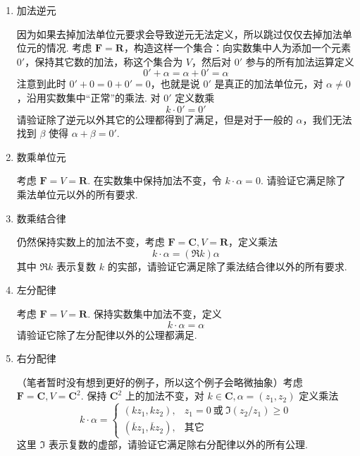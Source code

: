 \begin{exercise}
\begin{exgroup}
\begin{enumerate}
            \item 加法逆元

            因为如果去掉加法单位元要求会导致逆元无法定义，所以跳过仅仅去掉加法单位元的情况. 考虑 $\mathbf{F} = \mathbf{R}$，构造这样一个集合：向实数集中人为添加一个元素 $0'$，保持其它数的加法，称这个集合为 $V$，然后对 $0'$ 参与的所有加法运算定义
            \[
                0' + \alpha = \alpha + 0' = \alpha
            \]
            注意到此时 $0' + 0 = 0 + 0' = 0$，也就是说 $0'$ 是真正的加法单位元，对 $\alpha \neq 0$，沿用实数集中``正常''的乘法. 对 $0'$ 定义数乘
            \[
                k \cdot 0' = 0'
            \]
            请验证除了逆元以外其它的公理都得到了满足，但是对于一般的 $\alpha$，我们无法找到 $\beta$ 使得 $\alpha + \beta = 0'$.

            \item 数乘单位元

            考虑 $\mathbf{F} = V = \mathbf{R}$. 在实数集中保持加法不变，令 $k\cdot \alpha = 0$. 请验证它满足除了乘法单位元以外的所有要求.

            \item 数乘结合律

            仍然保持实数上的加法不变，考虑 $\mathbf{F}=\mathbf{C}, V=\mathbf{R}$，定义乘法
            \[
                k\cdot \alpha = (\Re k) \alpha
            \]
            其中 $\Re k$ 表示复数 $k$ 的实部，请验证它满足除了乘法结合律以外的所有要求.

            \item 左分配律

            考虑 $\mathbf{F}=V=\mathbf{R}$. 保持实数集中加法不变，定义
            \[
                k\cdot \alpha = \alpha
            \]
            请验证它除了左分配律以外的公理都满足.

            \item 右分配律

            （笔者暂时没有想到更好的例子，所以这个例子会略微抽象）考虑 $\mathbf{F}=\mathbf{C}, V=\mathbf{C}^2$. 保持 $\mathbf{C}^2$ 上的加法不变，对 $k\in\mathbf{C}, \alpha = (z_1, z_2)$ 定义乘法
            \[
                k\cdot\alpha = \begin{cases}
                    (k z_1, k z_2), & z_1 = 0~\text{或}~\Im(z_2 / z_1) \geqslant 0\\
                    (\overline{k} z_1, \overline{k} z_2), & \text{其它}
                \end{cases}
            \]
            这里 $\Im$ 表示复数的虚部，请验证它满足除右分配律以外的所有公理.
        \end{enumerate}
        \begin{answer}


\end{answer}
\end{exgroup}
\end{exercise}

